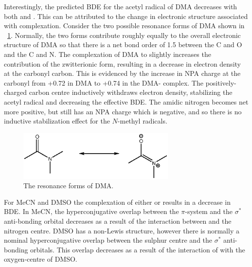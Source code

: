 Interestingly, the predicted BDE for the acetyl radical of DMA decreases with both  and . This can be attributed to the change in electronic structure associated with complexation. Consider the two possible resonance forms of DMA shown in ~\ref{fig:dma-res}. Normally, the two forms contribute roughly equally to the overall electronic structure of DMA so that there is a net bond order of 1.5 between the C and O and the C and N. The complexation of DMA to  slightly increases the contribution of the zwitterionic form, resulting in a decrease in electron density at the carbonyl carbon. This is evidenced by the increase in NPA charge at the carbonyl from +0.72 in DMA to +0.74 in the DMA- complex. The positively-charged carbon centre inductively withdraws electron density, stabilizing the acetyl radical and decreasing the effective BDE. The amidic nitrogen becomes net more positive, but still has an NPA charge which is negative, and so there is no inductive stabilization effect for the $N$-methyl radicals.

\begin{figure}[!htpb]
  \centering
  \includegraphics[width=0.7\textwidth]{figures/DMA-resonance.eps}
  \caption{The resonance forms of DMA.}
  \label{fig:dma-res}
\end{figure}

For MeCN and DMSO the complexation of either  or  results in a decrease in  BDE. In MeCN, the hyperconjugative overlap between the  $\pi$-system and the  $\sigma^*$ anti-bonding orbital decreases as a result of the interaction between  and the nitrogen centre. DMSO has a non-Lewis structure, however there is normally a nominal hyperconjugative overlap between the sulphur centre and the  $\sigma^*$ anti-bonding orbitals. This overlap decreases as a result of the interaction of  with the oxygen-centre of DMSO.


